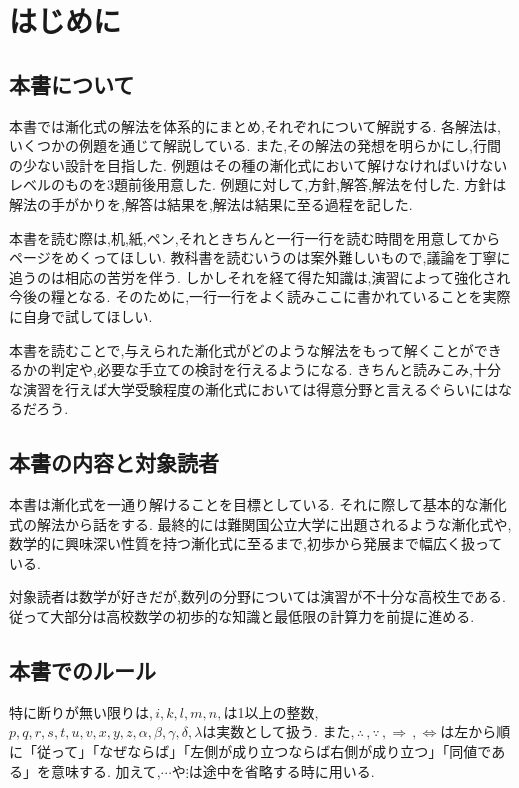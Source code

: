 
\section{はじめに}
\subsection{本書について}
本書では漸化式の解法を体系的にまとめ,それぞれについて解説する.
各解法は,いくつかの例題を通じて解説している.
また,その解法の発想を明らかにし,行間の少ない設計を目指した.
例題はその種の漸化式において解けなければいけないレベルのものを3題前後用意した.
例題に対して,方針,解答,解法を付した.
方針は解法の手がかりを,解答は結果を,解法は結果に至る過程を記した.

本書を読む際は,机,紙,ペン,それときちんと一行一行を読む時間を用意してからページをめくってほしい.
教科書を読むいうのは案外難しいもので,議論を丁寧に追うのは相応の苦労を伴う.
しかしそれを経て得た知識は,演習によって強化され今後の糧となる.
そのために,一行一行をよく読みここに書かれていることを実際に自身で試してほしい.

本書を読むことで,与えられた漸化式がどのような解法をもって解くことができるかの判定や,必要な手立ての検討を行えるようになる.
きちんと読みこみ,十分な演習を行えば大学受験程度の漸化式においては得意分野と言えるぐらいにはなるだろう.

\subsection{本書の内容と対象読者}
本書は漸化式を一通り解けることを目標としている.
それに際して基本的な漸化式の解法から話をする.
最終的には難関国公立大学に出題されるような漸化式や,数学的に興味深い性質を持つ漸化式に至るまで,初歩から発展まで幅広く扱っている.

対象読者は数学が好きだが,数列の分野については演習が不十分な高校生である.
従って大部分は高校数学の初歩的な知識と最低限の計算力を前提に進める.

\subsection{本書でのルール}
特に断りが無い限りは,\,$i,k,l,m,n,$は1以上の整数,\,$p,q,r,s,t,u,v,x,y,z,\alpha,\beta,\gamma,\delta,\lambda$は実数として扱う.
また,\,$\therefore\,,\because\,,\Rightarrow\,,\Leftrightarrow$は左から順に「従って」「なぜならば」「左側が成り立つならば右側が成り立つ」「同値である」を意味する.
加えて,$\cdots$や$\vdots$は途中を省略する時に用いる.
